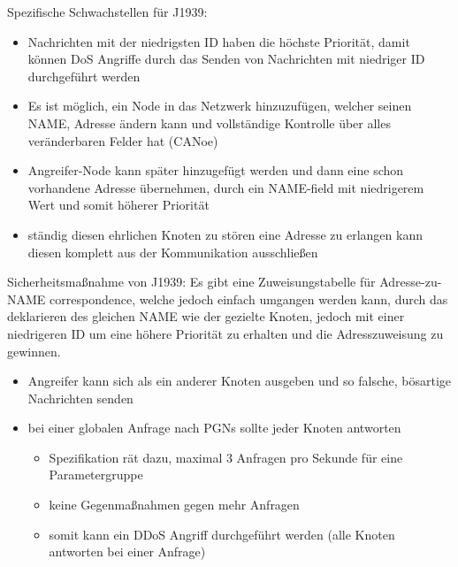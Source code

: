 Spezifische Schwachstellen für J1939:
\begin{itemize}
    \item Nachrichten mit der niedrigsten ID haben die höchste Priorität, damit können DoS Angriffe durch das Senden von Nachrichten mit niedriger ID durchgeführt werden
    \item Es ist möglich, ein Node in das Netzwerk hinzuzufügen, welcher seinen NAME, Adresse ändern kann und vollständige Kontrolle über alles veränderbaren Felder hat (CANoe)
    \item Angreifer-Node kann später hinzugefügt werden und dann eine schon vorhandene Adresse übernehmen, durch ein NAME-field mit niedrigerem Wert und somit höherer Priorität
    \item ständig diesen ehrlichen Knoten zu stören eine Adresse zu erlangen kann diesen komplett aus der Kommunikation ausschließen
\end{itemize}
Sicherheitsmaßnahme von J1939:
Es gibt eine Zuweisungstabelle für Adresse-zu-NAME correspondence, welche jedoch einfach umgangen werden
kann, durch das deklarieren des gleichen NAME wie der gezielte Knoten, jedoch mit einer niedrigeren ID
um eine höhere Priorität zu erhalten und die Adresszuweisung zu gewinnen.
\begin{itemize}
    \item Angreifer kann sich als ein anderer Knoten ausgeben und so falsche, bösartige Nachrichten senden
    \item bei einer globalen Anfrage nach PGNs sollte jeder Knoten antworten
    \begin{itemize}
        \item Spezifikation rät dazu, maximal 3 Anfragen pro Sekunde für eine Parametergruppe
        \item keine Gegenmaßnahmen gegen mehr Anfragen
        \item somit kann ein DDoS Angriff durchgeführt werden (alle Knoten antworten bei einer Anfrage)
    \end{itemize}
\end{itemize}

\cite{Murvay2018}

